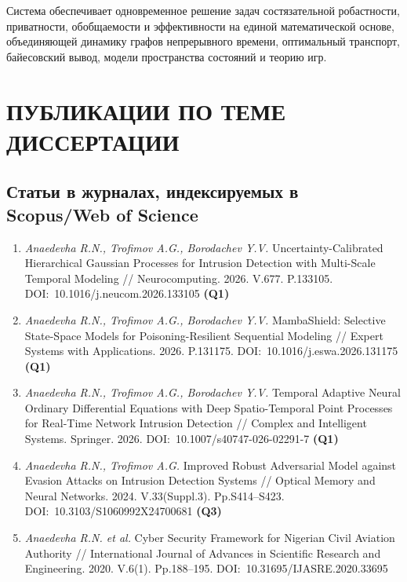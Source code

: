 \documentclass[12pt,a5paper]{article}
\begin{document}
Система обеспечивает одновременное решение задач состязательной робастности, приватности, обобщаемости и эффективности на единой математической основе, объединяющей динамику графов непрерывного времени, оптимальный транспорт, байесовский вывод, модели пространства состояний и теорию игр.

\vspace{1cm}

\section*{ПУБЛИКАЦИИ ПО ТЕМЕ ДИССЕРТАЦИИ}

\sloppy

\subsection*{Статьи в журналах, индексируемых в Scopus/Web of Science}

\begin{enumerate}
\item \textit{Anaedevha R.N., Trofimov A.G., Borodachev Y.V.} Uncertainty-Calibrated Hierarchical Gaussian Processes for Intrusion Detection with Multi-Scale Temporal Modeling // Neurocomputing. 2026. V.677. P.133105. DOI:~10.1016/j.neucom.2026.133105 \textbf{(Q1)}

\item \textit{Anaedevha R.N., Trofimov A.G., Borodachev Y.V.} MambaShield: Selective State-Space Models for Poisoning-Resilient Sequential Modeling // Expert Systems with Applications. 2026. P.131175. DOI:~10.1016/j.eswa.2026.131175 \textbf{(Q1)}

\item \textit{Anaedevha R.N., Trofimov A.G., Borodachev Y.V.} Temporal Adaptive Neural Ordinary Differential Equations with Deep Spatio-Temporal Point Processes for Real-Time Network Intrusion Detection // Complex and Intelligent Systems. Springer. 2026. DOI:~10.1007/s40747-026-02291-7 \textbf{(Q1)}

\item \textit{Anaedevha R.N., Trofimov A.G.} Improved Robust Adversarial Model against Evasion Attacks on Intrusion Detection Systems // Optical Memory and Neural Networks. 2024. V.33(Suppl.3). Pp.S414--S423. DOI:~10.3103/S1060992X24700681 \textbf{(Q3)}

\item \textit{Anaedevha R.N. et al.} Cyber Security Framework for Nigerian Civil Aviation Authority // International Journal of Advances in Scientific Research and Engineering. 2020. V.6(1). Pp.188--195. DOI:~10.31695/IJASRE.2020.33695
\end{enumerate}
\end{document}
